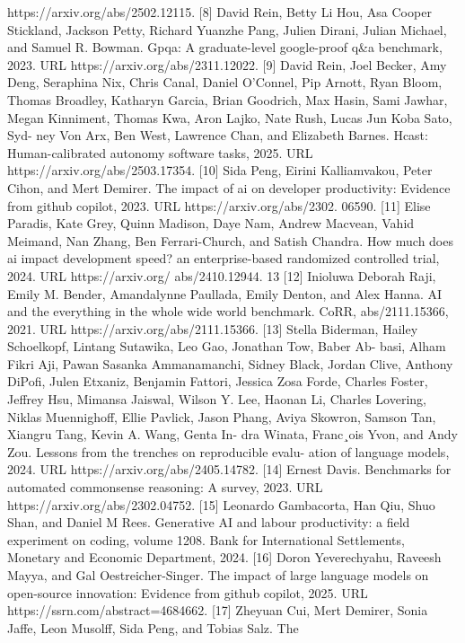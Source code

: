 https://arxiv.org/abs/2502.12115.
[8] David Rein, Betty Li Hou, Asa Cooper Stickland, Jackson Petty, Richard Yuanzhe Pang, Julien
Dirani, Julian Michael, and Samuel R. Bowman. Gpqa: A graduate-level google-proof q\&a
benchmark, 2023. URL https://arxiv.org/abs/2311.12022.
[9] David Rein, Joel Becker, Amy Deng, Seraphina Nix, Chris Canal, Daniel O’Connel, Pip
Arnott, Ryan Bloom, Thomas Broadley, Katharyn Garcia, Brian Goodrich, Max Hasin, Sami
Jawhar, Megan Kinniment, Thomas Kwa, Aron Lajko, Nate Rush, Lucas Jun Koba Sato, Syd-
ney Von Arx, Ben West, Lawrence Chan, and Elizabeth Barnes. Hcast: Human-calibrated
autonomy software tasks, 2025. URL https://arxiv.org/abs/2503.17354.
[10] Sida Peng, Eirini Kalliamvakou, Peter Cihon, and Mert Demirer. The impact of ai on developer
productivity: Evidence from github copilot, 2023. URL https://arxiv.org/abs/2302.
06590.
[11] Elise Paradis, Kate Grey, Quinn Madison, Daye Nam, Andrew Macvean, Vahid Meimand,
Nan Zhang, Ben Ferrari-Church, and Satish Chandra. How much does ai impact development
speed? an enterprise-based randomized controlled trial, 2024. URL https://arxiv.org/
abs/2410.12944.
13
[12] Inioluwa Deborah Raji, Emily M. Bender, Amandalynne Paullada, Emily Denton, and Alex
Hanna. AI and the everything in the whole wide world benchmark. CoRR, abs/2111.15366,
2021. URL https://arxiv.org/abs/2111.15366.
[13] Stella Biderman, Hailey Schoelkopf, Lintang Sutawika, Leo Gao, Jonathan Tow, Baber Ab-
basi, Alham Fikri Aji, Pawan Sasanka Ammanamanchi, Sidney Black, Jordan Clive, Anthony
DiPofi, Julen Etxaniz, Benjamin Fattori, Jessica Zosa Forde, Charles Foster, Jeffrey Hsu,
Mimansa Jaiswal, Wilson Y. Lee, Haonan Li, Charles Lovering, Niklas Muennighoff, Ellie
Pavlick, Jason Phang, Aviya Skowron, Samson Tan, Xiangru Tang, Kevin A. Wang, Genta In-
dra Winata, Franc¸ois Yvon, and Andy Zou. Lessons from the trenches on reproducible evalu-
ation of language models, 2024. URL https://arxiv.org/abs/2405.14782.
[14] Ernest Davis. Benchmarks for automated commonsense reasoning: A survey, 2023. URL
https://arxiv.org/abs/2302.04752.
[15] Leonardo Gambacorta, Han Qiu, Shuo Shan, and Daniel M Rees. Generative AI and labour
productivity: a field experiment on coding, volume 1208. Bank for International Settlements,
Monetary and Economic Department, 2024.
[16] Doron Yeverechyahu, Raveesh Mayya, and Gal Oestreicher-Singer.
The impact of large
language models on open-source innovation: Evidence from github copilot, 2025.
URL
https://ssrn.com/abstract=4684662.
[17] Zheyuan Cui, Mert Demirer, Sonia Jaffe, Leon Musolff, Sida Peng, and Tobias Salz. The
